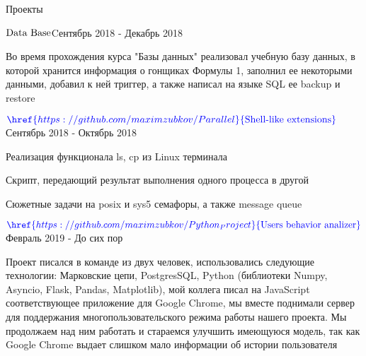 \documentclass{resume} %
\begin{document}





\begin{rSection}{Проекты}

\begin{rSubsection}{$\textnormal{Data Base}$}{Cентябрь 2018 - Декабрь 2018}{}{}
\item Во время прохождения курса "Базы данных" реализовал учебную базу данных, в которой хранится информация о гонщиках Формулы 1, заполнил ее некоторыми данными, добавил к ней триггер, а также написал на языке SQL ее backup и restore
\end{rSubsection}

\begin{rSubsection}{$\textcolor{blue}{\href{https://github.com/maximzubkov/Parallel}{\textnormal{Shell-like extensions}}}$}{Сентябрь 2018 - Октябрь 2018}{}{}
\item Реализация функционала ls, cp из Linux терминала
\item Скрипт, передающий результат выполнения одного процесса в другой
\item Сюжетные задачи на posix и sys5 семафоры, а также message queue
\end{rSubsection}

\begin{rSubsection}{$\textcolor{blue}{\href{https://github.com/maximzubkov/Python_Project}{\textnormal{Users behavior analizer}}}$}{Февраль 2019 - До сих пор}{}{}
\item Проект писался в команде из двух человек, использовались следующие технологии: Марковские цепи, PostgresSQL, Python (библиотеки Numpy, Asyncio, Flask, Pandas, Matplotlib), мой коллега писал на JavaScript соответствующее приложение для Google Chrome, мы вместе поднимали сервер для поддержания многопользовательского режима работы нашего проекта. Мы продолжаем над ним работать и стараемся улучшить имеющуюся модель, так как Google Chrome выдает слишком мало информации об истории пользователя
\end{rSubsection}


\end{rSection}
\end{document}
